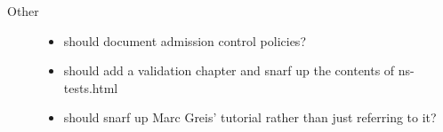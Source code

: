 \begin{description}
\item[Other]

        \begin{itemize}
        \item should document admission control policies?
        \item should add a validation chapter and snarf
                up the contents of ns-tests.html
        \item should snarf up Marc Greis' tutorial
                rather than just referring to it?
        \end{itemize}

\end{description}

